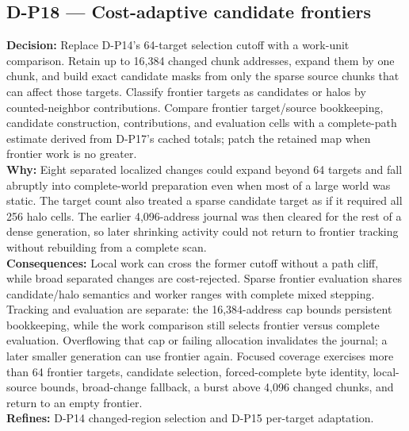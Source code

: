 \subsection*{D-P18 --- Cost-adaptive candidate frontiers}
\begin{decisionbox}[title={D-P18 \quad 2026-08-09}]
\textbf{Decision:} Replace D-P14's 64-target selection cutoff with a work-unit
comparison. Retain up to 16,384 changed chunk addresses, expand them by one
chunk, and build exact candidate masks from only the sparse source chunks that
can affect those targets. Classify frontier targets as candidates or halos by
counted-neighbor contributions. Compare frontier target/source bookkeeping,
candidate construction, contributions, and evaluation cells with a
complete-path estimate derived from D-P17's cached totals; patch the retained
map when frontier work is no greater.\\
\textbf{Why:} Eight separated localized changes could expand beyond 64 targets
and fall abruptly into complete-world preparation even when most of a large
world was static. The target count also treated a sparse candidate target as if
it required all 256 halo cells. The earlier 4,096-address journal was then
cleared for the rest of a dense generation, so later shrinking activity could
not return to frontier tracking without rebuilding from a complete scan.\\
\textbf{Consequences:} Local work can cross the former cutoff without a path
cliff, while broad separated changes are cost-rejected. Sparse frontier
evaluation shares candidate/halo semantics and worker ranges with complete
mixed stepping. Tracking and evaluation are separate: the 16,384-address cap
bounds persistent bookkeeping, while the work comparison still selects frontier
versus complete evaluation. Overflowing that cap or failing allocation
invalidates the journal; a later smaller generation can use frontier again.
Focused coverage exercises more than 64 frontier targets, candidate selection,
forced-complete byte identity, local-source bounds, broad-change fallback, a
burst above 4,096 changed chunks, and return to an empty frontier.\\
\textbf{Refines:} D-P14 changed-region selection and D-P15 per-target
adaptation.
\end{decisionbox}

